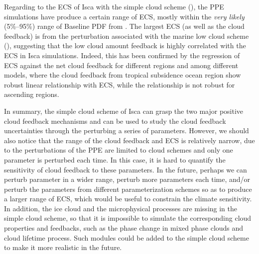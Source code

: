 Regarding to the ECS of Isca with the simple cloud scheme (), the PPE simulations have produce a certain range of ECS, mostly within the \textit{very likely} (5\%--95\%) range of Baseline PDF from \cite{Sherwood2020}. The largest ECS (as well as the cloud feedback) is from the perturbation associated with the marine low cloud scheme (), suggesting that the low cloud amount feedback is highly correlated with the ECS in Isca simulations. Indeed, this has been confirmed by the regression of ECS against the net cloud feedback for different regions and among different models, where the cloud feedback from tropical subsidence ocean region show robust linear relationship with ECS, while the relationship is not robust for ascending regions.

In summary, the simple cloud scheme of Isca can grasp the two major positive cloud feedback mechanisms and can be used to study the cloud feedback uncertainties through the perturbing a series of parameters. However, we should also notice that the range of the cloud feedback and ECS is relatively narrow, due to the perturbations of the PPE are limited to cloud schemes and only one parameter is perturbed each time. In this case, it is hard to quantify the sensitivity of cloud feedback to these parameters. In the future, perhaps we can perturb parameter in a wider range, perturb more parameters each time, and/or perturb the parameters from different parameterization schemes so as to produce a larger range of ECS, which would be useful to constrain the climate sensitivity. In addition, the ice cloud and the microphysical processes are missing in the simple cloud scheme, so that it is impossible to simulate the corresponding cloud properties and feedbacks, such as the phase change in mixed phase clouds and cloud lifetime process. Such modules could be added to the simple cloud scheme to make it more realistic in the future.
